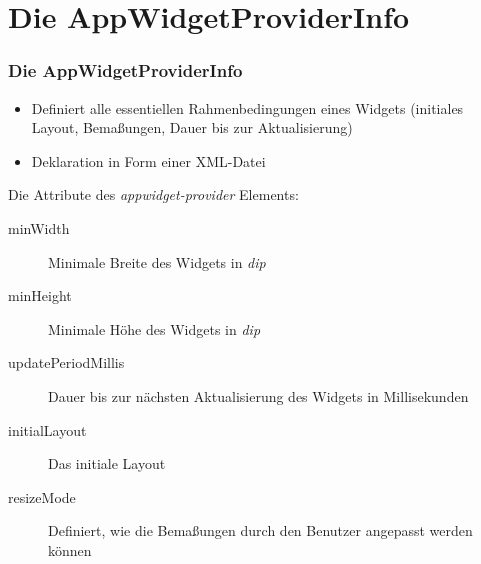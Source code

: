 \section{Die AppWidgetProviderInfo}
\begin{frame}[label=widget_provider_info]
   \frametitle{Die AppWidgetProviderInfo}
   \begin{itemize}
      \item Definiert alle essentiellen Rahmenbedingungen eines Widgets
         (initiales Layout, Bemaßungen, Dauer bis zur Aktualisierung)
      \item Deklaration in Form einer XML-Datei
   \end{itemize}

   
   	
   Die Attribute des \emph{appwidget-provider} Elements:
   
   \begin{description}
      \item[minWidth] Minimale Breite des Widgets in \emph{dip}
      \item[minHeight] Minimale Höhe des Widgets in \emph{dip}
      \item[updatePeriodMillis] Dauer bis zur nächsten Aktualisierung 
         des Widgets in Millisekunden
      \item[initialLayout] Das initiale Layout
      \item[resizeMode] Definiert, wie die Bemaßungen durch den Benutzer 
         angepasst werden können
   \end{description}
\end{frame}

